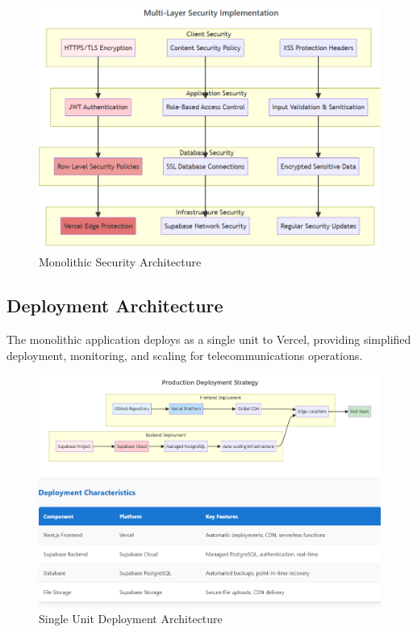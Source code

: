 \begin{figure}[hbt!]
    \centering
    \includegraphics[width=0.9\linewidth]{img/chap_02/security_architecture.png}
    \caption{Monolithic Security Architecture}
    \label{fig:security_architecture}
\end{figure}

\subsection{Deployment Architecture}
The monolithic application deploys as a single unit to Vercel, providing simplified deployment, monitoring, and scaling for telecommunications operations.

\begin{figure}[hbt!]
    \centering
    \includegraphics[width=0.85\linewidth]{img/chap_02/deployment_architecture.png}
    \caption{Single Unit Deployment Architecture}
    \label{fig:deployment_architecture}
\end{figure}

